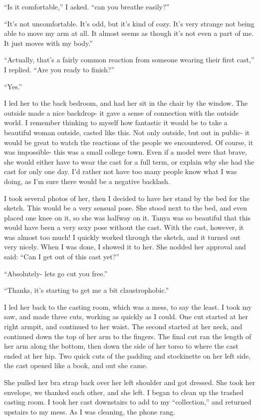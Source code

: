 ``Is it comfortable,'' I asked. ``can you breathe easily?''

``It's not uncomfortable. It's odd, but it's kind of cozy. It's very strange not being able
to move my arm at all. It almost seems as though it's not even a part of me. It just moves with
my body.''

``Actually, that's a fairly common reaction from someone wearing their first cast,'' I
replied. ``Are you ready to finish?''

``Yes.''

I led her to the back bedroom, and had her sit in the chair by the window. The outside made
a nice backdrop- it gave a sense of connection with the outside world. I remember thinking to
myself how fantastic it would be to take a beautiful woman outside, casted like this. Not only
outside, but out in public- it would be great to watch the reactions of the people we
encountered. Of course, it was impossible- this was a small college town. Even if a model were
that brave, she would either have to wear the cast for a full term, or explain why she had the
cast for only one day. I'd rather not have too many people know what I was doing, as I'm sure
there would be a negative backlash.

I took several photos of her, then I decided to have her stand by the bed for the sketch.
This would be a very sensual pose. She stood next to the bed, and even placed one knee on it, so
she was halfway on it. Tanya was so beautiful that this would have been a very sexy pose without
the cast. With the cast, however, it was almost too much! I quickly worked through the sketch,
and it turned out very nicely. When I was done, I showed it to her. She nodded her approval and
said: ``Can I get out of this cast yet?''

``Absolutely- lets go cut you free.''

``Thanks, it's starting to get me a bit claustrophobic.''

I led her back to the casting room, which was a mess, to say the least. I took my saw, and
made three cuts, working as quickly as I could. One cut started at her right armpit, and
continued to her waist. The second started at her neck, and continued down the top of her arm to
the fingers. The final cut ran the length of her arm along the bottom, then down the side of her
torso to where the cast ended at her hip. Two quick cuts of the padding and stockinette on her
left side, the cast opened like a book, and out she came.

She pulled her bra strap back over her left shoulder and got dressed. She took her envelope,
we thanked each other, and she left. I began to clean up the trashed casting room. I took her
cast downstairs to add to my ``collection,'' and returned upstairs to my mess. As I was
cleaning,
the phone rang.

